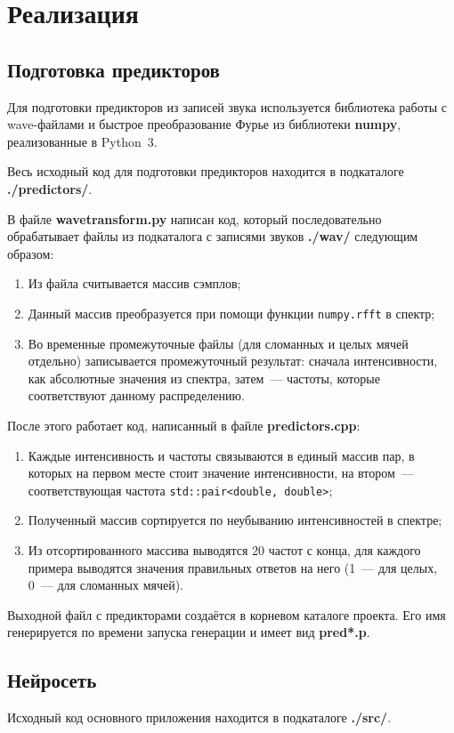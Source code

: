 \section{Реализация}
\subsection{Подготовка предикторов}
	Для подготовки предикторов из записей звука используется библиотека работы с wave-файлами и быстрое преобразование
	Фурье из библиотеки \textbf{numpy}, реализованные в Python~3.

	Весь исходный код для подготовки предикторов находится в подкаталоге \textbf{./predictors/}.

	В файле \textbf{wavetransform.py} написан код, который последовательно обрабатывает файлы из подкаталога с
	записями звуков	\textbf{./wav/} следующим образом:
	\begin{enumerate}
		\item Из файла считывается массив сэмплов;
		\item Данный массив преобразуется при помощи функции \texttt{numpy.rfft} в спектр;
		\item Во временные промежуточные файлы (для сломанных и целых мячей отдельно) записывается промежуточный результат:
				сначала интенсивности, как абсолютные значения из спектра, затем~--- частоты, которые соответствуют данному распределению.
	\end{enumerate}

	После этого работает код, написанный в файле \textbf{predictors.cpp}:
	\begin{enumerate}
		\item Каждые интенсивность и частоты связываются в единый массив пар, в которых на первом месте стоит
				значение интенсивности, на втором~--- соответствующая частота \texttt{std::pair<double, double>};
		\item Полученный массив сортируется по неубыванию интенсивностей в спектре;
		\item Из отсортированного массива выводятся 20 частот с конца, для каждого примера выводятся значения правильных
				ответов на него (1~--- для целых, 0~--- для сломанных мячей).
	\end{enumerate}

	Выходной файл с предикторами создаётся в корневом каталоге проекта. Его имя генерируется по
	времени запуска генерации и имеет вид \textbf{pred*.p}.

\subsection{Нейросеть}
	Исходный код основного приложения находится в подкаталоге \textbf{./src/}.


